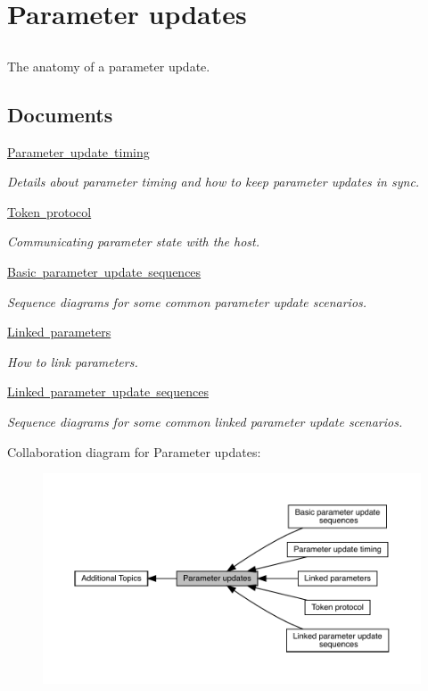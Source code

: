 \hypertarget{a00820}{}\section{Parameter updates}
\label{a00820}


\subsection{ }
The anatomy of a parameter update. 

\subsection*{Documents}
\begin{DoxyCompactItemize}
\item 
\mbox{\hyperlink{a00821}{Parameter update timing}}
\begin{DoxyCompactList}\small\item\em Details about parameter timing and how to keep parameter updates in sync. \end{DoxyCompactList}\item 
\mbox{\hyperlink{a00822}{Token protocol}}
\begin{DoxyCompactList}\small\item\em Communicating parameter state with the host. \end{DoxyCompactList}\item 
\mbox{\hyperlink{a00823}{Basic parameter update sequences}}
\begin{DoxyCompactList}\small\item\em Sequence diagrams for some common parameter update scenarios. \end{DoxyCompactList}\item 
\mbox{\hyperlink{a00824}{Linked parameters}}
\begin{DoxyCompactList}\small\item\em How to link parameters. \end{DoxyCompactList}\item 
\mbox{\hyperlink{a00825}{Linked parameter update sequences}}
\begin{DoxyCompactList}\small\item\em Sequence diagrams for some common linked parameter update scenarios. \end{DoxyCompactList}\end{DoxyCompactItemize}
Collaboration diagram for Parameter updates\+:
\nopagebreak
\begin{figure}[H]
\begin{center}
\leavevmode
\includegraphics[width=350pt]{a00820}
\end{center}
\end{figure}
